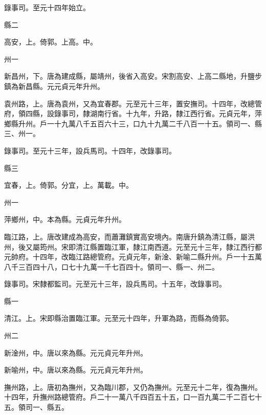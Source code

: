 \begin{pinyinscope}
 錄事司。至元十四年始立。



 縣二



 高安，上。倚郭。上高。中。



 州一



 新昌州，下。唐為建成縣，屬靖州，後省入高安。宋割高安、上高二縣地，升鹽步鎮為新昌縣。元元貞元年升州。



 袁州路，上。唐為袁州，又為宜春郡。元至元十三年，置安撫司。十四年，改總管府，領四縣，設錄事司，隸湖南行省。十九年，升路，隸江西行省。元貞元年，萍鄉縣升州。戶一十九萬八千五百六十三，口九十九萬二千八百一十五。領司一、縣三、州一。



 錄事司。至元十三年，設兵馬司。十四年，改錄事司。



 縣三



 宜春，上。倚郭。分宜，上。萬載。中。



 州一



 萍鄉州，中。本為縣。元貞元年升州。



 臨江路，上。唐改建成為高安，而蕭灘鎮實高安境內。南唐升鎮為清江縣，屬洪州，後又屬筠州。宋即清江縣置臨江軍，隸江南西道。元至元十三年，隸江西行都元帥府。十四年，改臨江路總管府。元貞元年，新淦、新喻二縣升州。戶一十五萬八千三百四十八，口七十九萬一千七百四十。領司一、縣一、州二。



 錄事司。宋隸都監司。元至元十三年，設兵馬司。十五年，改錄事司。



 縣一



 清江。上。宋即縣治置臨江軍。元至元十四年，升軍為路，而縣為倚郭。



 州二



 新淦州，中。唐以來為縣。元元貞元年升州。



 新喻州，中。唐以來為縣。元元貞元年升州。



 撫州路，上。唐初為撫州，又為臨川郡，又仍為撫州。元至元十二年，復為撫州。十四年，升撫州路總管府。戶二十一萬八千四百五十五，口一百九萬二千二百七十五。領司一、縣五。




\end{pinyinscope}
